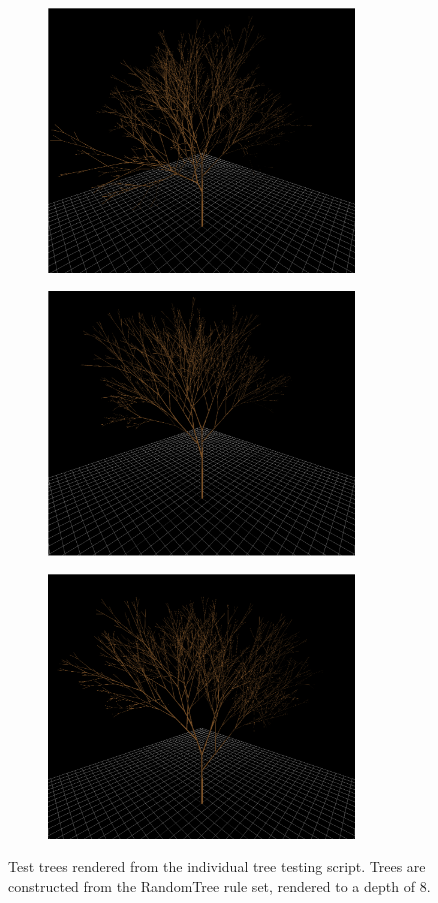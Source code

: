 \documentclass{article}
\begin{document}
\begin{figure}[p]
\centering
\begin{subfigure}[b]{\textwidth}
\centering
    \includegraphics[height=7cm, keepaspectratio=true]{fig/t1}
    \label{fig:fig/trees}
\end{subfigure}

\begin{subfigure}[b]{\textwidth}
\centering
    \includegraphics[height=7cm, keepaspectratio=true]{fig/t2}
    \label{fig:fig/trees}
\end{subfigure}

\begin{subfigure}[b]{\textwidth}
\centering
    \includegraphics[height=7cm, keepaspectratio=true]{fig/t3}
    \label{fig:fig/trees}
\end{subfigure}
    \caption[Test Trees]{Test trees rendered from the individual tree testing script.
Trees are constructed from the RandomTree rule set, rendered to a depth of 8.}
\end{figure}
\end{document}
